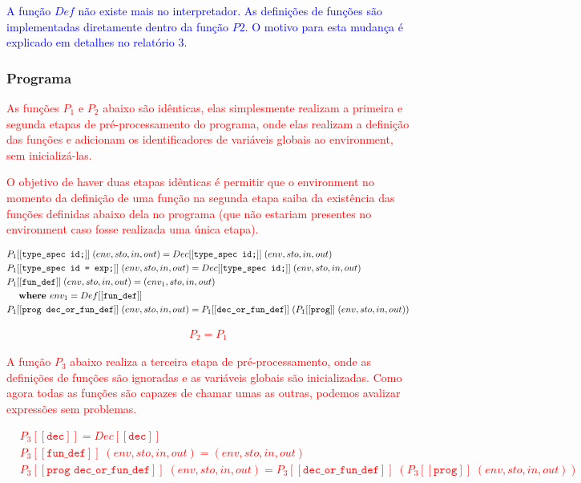 \documentclass[12pt]{article}
\newcommand{\blu}{\textcolor{blue}}
\newcommand{\red}{\textcolor{red}}
\newcommand\eb[1]{[[\texttt{#1}]]}
\begin{document}
\blu{A função $Def$ não existe mais no interpretador. As definições de funções são implementadas diretamente dentro da função $P2$. O motivo para esta mudança é explicado em detalhes no relatório 3.}

\subsubsection{Programa}

\red{
As funções $P_1$ e $P_2$ abaixo são idênticas, elas simplesmente realizam a primeira e segunda etapas de pré-processamento do programa, onde elas realizam a definição das funções e adicionam os identificadores de variáveis globais ao environment, sem inicializá-las.
}

\red{
 O objetivo de haver duas etapas idênticas é permitir que o environment no momento da definição de uma função na segunda etapa saiba da existência das funções definidas abaixo dela no programa (que não estariam presentes no environment caso fosse realizada uma única etapa).
}

\red{
\begin{align*}
&P_1\eb{type\_spec id;}\; (env,sto,in,out) = Dec\eb{type\_spec id;}\; (env,sto,in,out)\\
&P_1\eb{type\_spec id = exp;}\; (env,sto,in,out) = Dec\eb{type\_spec id;}\; (env,sto,in,out) \\
&P_1\eb{fun\_def}\;(env,sto,in,out) = (env_1,sto,in,out)\\
&\hspace{3ex}\textbf{where } env_1 = Def\eb{fun\_def} \\
&P_1\eb{prog dec\_or\_fun\_def}\;(env,sto,in,out) = P_1\eb{dec\_or\_fun\_def}\;(P_1\eb{prog}\;(env,sto,in,out))
\end{align*}
}

\red{
\begin{align*}
P_2 = P_1
\end{align*}
}

\red{
A função $P_3$ abaixo realiza a terceira etapa de pré-processamento, onde as definições de funções são ignoradas e as variáveis globais são inicializadas. Como agora todas as funções são capazes de chamar umas as outras, podemos avalizar expressões sem problemas.
}

\red{
\begin{align*}
&P_3\eb{dec} = Dec\eb{dec} \\
&P_3\eb{fun\_def}\;(env,sto,in,out) = (env,sto,in,out) \\
&P_3\eb{prog dec\_or\_fun\_def}\; (env,sto,in,out) = P_3\eb{dec\_or\_fun\_def}\; (P_3\eb{prog}\;(env,sto,in,out))\\
\end{align*}
}
\end{document}
